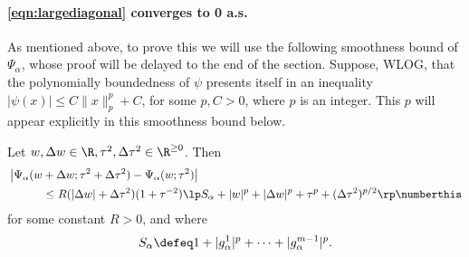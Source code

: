 \documentclass[main.tex]{subfiles}
\begin{document}
\paragraph{\cref{eqn:largediagonal} converges to 0 a.s.}

As mentioned above, to prove this we will use the following smoothness bound of $\Psi_\alpha$, whose proof will be delayed to the end of the section.
Suppose, WLOG, that the polynomially boundedness of $\psi$ presents itself in an inequality $|\psi(x)| \le C \|x\|^p_{p} + C$, for some $p, C > 0$, where $p$ is an integer.
This $p$ will appear explicitly in this smoothness bound below.

\begin{lemma}\label{lemma:PsiAlphaSmoothnessBound}
Let $w, \Delta w \in \R, \tau^2, \Delta \tau^2 \in \R^{\ge 0}$.
Then
\begin{align*}
&\left| \Psi_\alpha(w+\Delta w ; \tau^2 + \Delta \tau^2) - \Psi_\alpha(w; \tau^2)\right|
\\
&\quad\quad\quad\le
    R
    (|\Delta w| + \Delta \tau^2)
    (1 + \tau^{-2})
        \lp S_\alpha + |w|^p + |\Delta w|^p + \tau^p + (\Delta\tau^2)^{p/2} \rp
    \numberthis
    \label{eqn:PsiSmoothness}
\end{align*}
for some constant $R > 0$, and where
\[S_\alpha \defeq 1 + |g^1_\alpha|^{p} + \cdots + |g^{\MM-1}_\alpha|^p.\]
\end{lemma}
\end{document}
